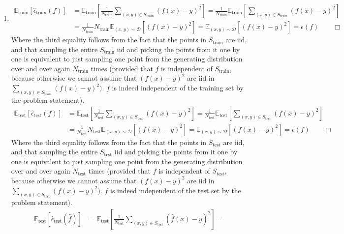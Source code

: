\documentclass{article}
\newcommand{\1}{\mathbf{1}}
\newcommand{\E}{\mathbb{E}}
\begin{document}
\begin{enumerate}
    \item \begin{align*}
                \E_{\text{train}}[ \widehat\epsilon_{\text{train}}(f) ]
        &= \E_{\text{train}}\left[\frac{1}{N_{\text{train}}} \sum_{(x,y)\in S_{\text{train}}} (f(x)-y)^2\right] = 
        \frac{1}{N_{\text{train}}} \E_{\text{train}}\left[\sum_{(x,y)\in S_{\text{train}}} (f(x)-y)^2\right]  \\
        &= \frac{1}{N_{\text{train}}} N_{\text{train}} \E_{(x,y)\sim\mathcal{D}}[ (f(x) - y)^2 ] =  \E_{(x,y)\sim\mathcal{D}}[ (f(x) - y)^2 ] = \epsilon(f) \qquad \Box
        \end{align*}
        Where the third equality follows from the fact that the points in $S_{\text{train}}$ are iid, and that sampling the entire $S_{\text{train}}$ iid and picking the points from it one by one is equivalent to just sampling one point from the generating distribution over and over again $N_{\text{train}}$ times (provided that $f$ is independent of $S_{\text{train}}$, because otherwise we cannot assume that $(f(x) - y)^2$ are iid in $\sum_{(x,y)\in S_{\text{train}}} (f(x)-y)^2)$. $f$ is indeed independent of the training set by the problem statement). 
        \begin{align*}
        \E_{\text{test}}[ \widehat\epsilon_{\text{test}}(f) ]
        &= \E_{\text{test}}\left[\frac{1}{N_{\text{test}}} \sum_{(x,y)\in S_{\text{test}}} (f(x)-y)^2\right] = 
        \frac{1}{N_{\text{test}}} \E_{\text{test}}\left[\sum_{(x,y)\in S_{\text{test}}} (f(x)-y)^2\right]  \\
        &= \frac{1}{N_{\text{test}}} N_{\text{test}} \E_{(x,y)\sim\mathcal{D}}[ (f(x) - y)^2 ] =  \E_{(x,y)\sim\mathcal{D}}[ (f(x) - y)^2 ] = \epsilon(f)\qquad \Box
        \end{align*}
        Where the third equality follows from the fact that the points in $S_{\text{test}}$ are iid, and that sampling the entire $S_{\text{test}}$ iid and picking the points from it one by one is equivalent to just sampling one point from the generating distribution over and over again $N_{\text{test}}$ times (provided that $f$ is independent of $S_{\text{test}}$, because otherwise we cannot assume that $(f(x) - y)^2$ are iid in $\sum_{(x,y)\in S_{\text{test}}} (f(x)-y)^2)$. $f$ is indeed independent of the test set by the problem statement).
        \begin{align*}
        \E_{\text{test}}[ \widehat\epsilon_{\text{test}}(\widehat{f}) ]
        &= \E_{\text{test}}\left[\frac{1}{N_{\text{test}}} \sum_{(x,y)\in S_{\text{test}}} (\widehat{f}(x)-y)^2\right] = 

\end{align*}
\end{enumerate}
\end{document}
